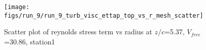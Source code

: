 \begin{figure}[H]
\centering
\texttt{[image: figs/run\_9/run\_9\_turb\_visc\_ettap\_top\_vs\_r\_mesh\_scatter]}
\caption{Scatter plot of reynolds stress term vs radius at $z/c$=5.37, $V_{free}$=30.86, station1}
\label{fig:run_9_turb_visc_ettap_top_vs_r_mesh_scatter}
\end{figure}


